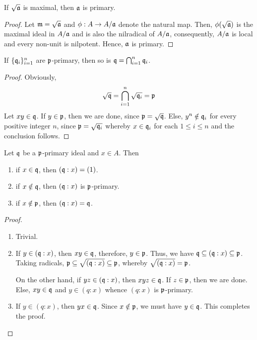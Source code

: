 \begin{proposition}
    If $\sqrt{\mathfrak a}$ is maximal, then $\mathfrak a$ is primary.
\end{proposition}
\begin{proof}
    Let $\mathfrak m = \sqrt{\mathfrak a}$ and $\phi: A\to A/\mathfrak a$ denote the natural map. Then, $\phi(\sqrt{\mathfrak a})$ is the maximal ideal in $A/\mathfrak a$ and is also the nilradical of $A/\mathfrak a$, consequently, $A/\mathfrak a$ is local and every non-unit is nilpotent. Hence, $\mathfrak a$ is primary.
\end{proof}

\begin{lemma}
    If $\{\mathfrak q_i\}_{i = 1}^n$ are $\mathfrak p$-primary, then so is $\mathfrak q=\bigcap_{i = 1}^n\mathfrak q_i$.
\end{lemma}
\begin{proof}
    Obviously, 
    \begin{equation*}
        \sqrt{\mathfrak q} = \bigcap_{i = 1}^n\sqrt{\mathfrak q_i} = \mathfrak p
    \end{equation*}
    Let $xy\in\mathfrak q$. If $y\in\mathfrak p$, then we are done, since $\mathfrak p = \sqrt{\mathfrak q}$. Else, $y^n\notin\mathfrak q_i$ for every positive integer $n$, since $\mathfrak p = \sqrt{\mathfrak q_i}$ whereby $x\in\mathfrak q_i$ for each $1\le i\le n$ and the conclusion follows.
\end{proof}

\begin{lemma}
    Let $\mathfrak q$ be a $\mathfrak p$-primary ideal and $x\in A$. Then 
    \begin{enumerate}[label=(\alph*)]
        \item if $x\in\mathfrak q$, then $(\mathfrak q: x) = (1)$.
        \item if $x\notin\mathfrak q$, then $(\mathfrak q: x)$ is $\mathfrak p$-primary.
        \item if $x\notin\mathfrak p$, then $(\mathfrak q: x) = \mathfrak q$.
    \end{enumerate}
\end{lemma}
\begin{proof}
\begin{enumerate}[label=(\alph*)]
    \item Trivial.
    \item If $y\in(\mathfrak q:x)$, then $xy\in\mathfrak q$, therefore, $y\in\mathfrak p$. Thus, we have $\mathfrak q\subseteq(\mathfrak q:x)\subseteq\mathfrak p$. Taking radicals, $\mathfrak p\subseteq\sqrt{(\mathfrak q:x)}\subseteq\mathfrak p$, whereby $\sqrt{(\mathfrak q: x)} = \mathfrak p$.

    On the other hand, if $yz\in(\mathfrak q: x)$, then $xyz\in\mathfrak q$. If $z\in\mathfrak p$, then we are done. Else, $xy\in\mathfrak q$ and $y\in(q:x)$ whence $(q: x)$ is $\mathfrak p$-primary.
    \item If $y\in(q: x)$, then $yx\in\mathfrak q$. Since $x\notin\mathfrak p$, we must have $y\in\mathfrak q$. This completes the proof.
\end{enumerate}
\end{proof}

